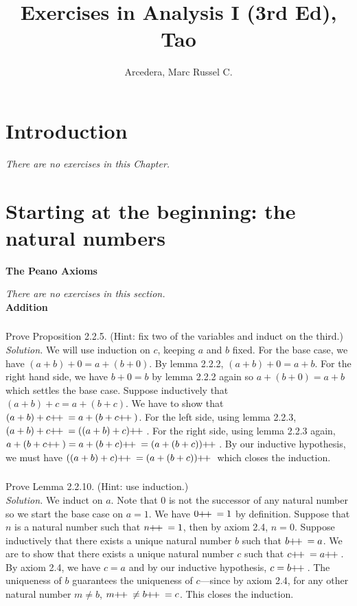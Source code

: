 \documentclass{amsart}
\title{Exercises in Analysis I (3rd Ed), Tao}
\author{Arcedera, Marc Russel C.}
\theoremstyle{definition}
\newcommand{\soln}{\newline\textit{Solution.} }
\newcommand{\pls}{\mathop{\hspace{-2pt}+\hspace{-3.5pt}+{}}}
\begin{document}
\maketitle
\tableofcontents
\section{Introduction}
\textit{There are no exercises in this Chapter.}


\section{Starting at the beginning: the natural numbers}

\textbf{The Peano Axioms} \addtocounter{subsection}{1}
\textit{There are no exercises in this section.} \\

\textbf{Addition} \addtocounter{subsection}{1}

\subsubsection{} Prove Proposition 2.2.5. (Hint: fix two of the variables and induct on the third.) \\
\soln We will use induction on $c$, keeping $a$ and $b$ fixed. For the base case, we have $(a+b)+0=a+(b+0)$. By lemma 2.2.2, $(a+b)+0=a+b$. For the right hand side, we have $b+0=b$ by lemma 2.2.2 again so $a+(b+0)=a+b$ which settles the base case. Suppose inductively that $(a+b)+c=a+(b+c)$. We have to show that $(a+b)+c\pls=a+(b+c\pls)$. For the left side, using lemma 2.2.3, $(a+b)+c\pls=((a+b)+c)\pls$. For the right side, using lemma 2.2.3 again, $a+(b+c\pls)=a+(b+c)\pls=(a+(b+c))\pls$. By our inductive hypothesis, we must have $((a+b)+c)\pls=(a+(b+c))\pls$ which closes the induction. \\

\subsubsection{} Prove Lemma 2.2.10. (Hint: use induction.)\\
\soln We induct on $a$. Note that $0$ is not the successor of any natural number so we start the base case on $a=1$. We have $0\pls=1$ by definition. Suppose that $n$ is a natural number such that $n\pls=1$, then by axiom 2.4, $n=0$. Suppose inductively that there exists a unique natural number $b$ such that $b\pls=a$. We are to show that there exists a unique natural number $c$ such that $c\pls=a\pls$. By axiom 2.4, we have $c=a$ and by our inductive hypothesis, $c=b\pls$. The uniqueness of $b$ guarantees the uniqueness of $c$---since by axiom 2.4, for any other natural number $m\neq b$, $m\pls\neq b\pls =c$. This closes the induction. \\
\end{document}
